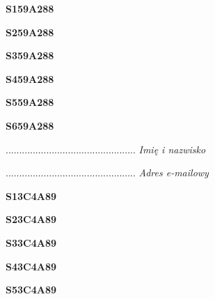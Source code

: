 \begin{turn}{90}\huge \textbf{S159A288}\end{turn}

\begin{turn}{90}\huge \textbf{S259A288}\end{turn}

\begin{turn}{90}\huge \textbf{S359A288}\end{turn}

\begin{turn}{90}\huge \textbf{S459A288}\end{turn}

\begin{turn}{90}\huge \textbf{S559A288}\end{turn}

\begin{turn}{90}\huge \textbf{S659A288}\end{turn}

\begin{turn}{90}\begin{minipage}{\linewidth} \vspace{20mm} ................................................  \textit{Imię i nazwisko}\end{minipage}\end{turn}

\begin{turn}{90}\begin{minipage}{\linewidth} \vspace{20mm} ................................................  \textit{Adres e-mailowy}\end{minipage}\end{turn}

\begin{turn}{90}\huge \textbf{S13C4A89}\end{turn}

\begin{turn}{90}\huge \textbf{S23C4A89}\end{turn}

\begin{turn}{90}\huge \textbf{S33C4A89}\end{turn}

\begin{turn}{90}\huge \textbf{S43C4A89}\end{turn}

\begin{turn}{90}\huge \textbf{S53C4A89}\end{turn}

